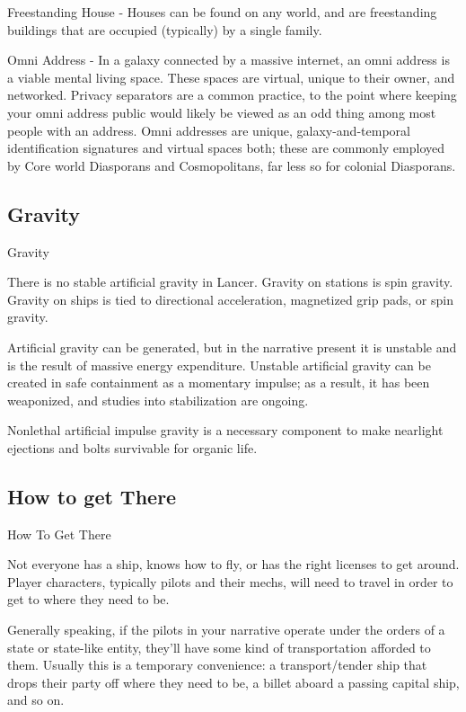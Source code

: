 Freestanding House - Houses can be found on any world, and are freestanding buildings that are  
occupied (typically) by a single family. 
 

Omni Address - In a galaxy connected by a massive internet, an omni address is a viable mental  
living space. These spaces are virtual, unique to their owner, and networked. Privacy separators  
are a common practice, to the point where keeping your omni address public would likely be  
viewed as an odd thing among most people with an address. Omni addresses are unique,  
galaxy-and-temporal identification signatures and virtual spaces both; these are commonly  
employed by Core world Diasporans and Cosmopolitans, far less so for colonial Diasporans. 
 

                                                                                                                     

\subsection{Gravity}
Gravity  

There is no stable artificial gravity in Lancer. Gravity on stations is spin gravity. Gravity on ships is  
tied to directional acceleration, magnetized grip pads, or spin gravity. 
 

Artificial gravity can be generated, but in the narrative present it is unstable and is the result of  
massive energy expenditure. Unstable artificial gravity can be created in safe containment as a  
momentary impulse; as a result, it has been weaponized, and studies into stabilization are  
ongoing. 
 

Nonlethal artificial impulse gravity is a necessary component to make nearlight ejections and  
bolts survivable for organic life.   
\subsection{How to get There}
How To Get There  

Not everyone has a ship, knows how to fly, or has the right licenses to get around. Player  
characters, typically pilots and their mechs, will need to travel in order to get to where they need  
to be. 
 

Generally speaking, if the pilots in your narrative operate under the orders of a state or state-like  
entity, they’ll have some kind of transportation afforded to them. Usually this is a temporary  
convenience: a transport/tender ship that drops their party off where they need to be, a billet  
aboard a passing capital ship, and so on. 
 

